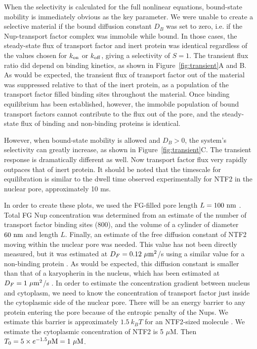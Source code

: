 When the selectivity is calculated for the full nonlinear equations, bound-state mobility is immediately obvious as the key parameter.  We were unable to create a selective material if the bound diffusion constant $D_B$ was set to zero, i.e. if the Nup-transport factor complex was immobile while bound.  In those cases, the steady-state flux of transport factor and inert protein was identical regardless of the values chosen for $k_{\rm on}$ or $k_{\rm off}$, giving a selectivity of $S = 1$.  The transient flux ratio did depend on binding kinetics, as shown in Figure~\ref{fig:transient}A and B.  As would be expected, the transient flux of transport factor out of the material was suppressed relative to that of the inert protein, as a population of the transport factor filled binding sites throughout the material.  Once binding equilibrium has been established, however, the immobile population of bound transport factors cannot contribute to the flux out of the pore, and the steady-state flux of binding and non-binding proteins is identical.

However, when bound-state mobility is allowed and $D_B > 0$, the system's selectivity can greatly increase, as shown in Figure~\ref{fig:transient}C.  The transient response is dramatically different as well.  Now transport factor flux very rapidly outpaces that of inert protein.  It should be noted that the timescale for equilibration is similar to the dwell time observed experimentally for NTF2 in the nuclear pore, approximately 10 ms.

In order to create these plots, we used the FG-filled pore length $L = 100\ {\rm nm}$
\cite{frenkiel-krispin10, maimon12}.  Total FG Nup concentration was determined from an estimate of the number of transport factor binding sites (800), and the volume of a cylinder of diameter $60\ {\rm nm}$ and length $L$.  Finally, an estimate of the free diffusion constant of NTF2 moving within the nuclear pore was needed.  This value has not been directly measured, but it was estimated at $D_F = 0.12 \ \mu\mathrm{m}^2$/s using a similar value for a non-binding protein \cite{ribbeck01}.  As would be expected, this diffusion constant is smaller than that of a karyopherin in the nucleus, which has been estimated at $D_F =1 \ \mu\mathrm{m}^2$/s \cite{cardarelli10}.  In order to estimate the concentration gradient between nucleus and cytoplasm, we need to know the concentration of transport factor just inside the cytoplasmic side of the nuclear pore.  There will be an energy barrier to any protein entering the pore because of the entropic penalty of the Nups.  We estimate this barrier is approximately $1.5\ k_B T$ for an NTF2-sized molecule \cite{timney16}.  We estimate the cytoplasmic concentration of NTF2 is 5 $\mu$M.  Then $T_0= 5 \times e^{-1.5} \mu \mathrm{M} = 1 \mathrm{\ \mu M}$.  

